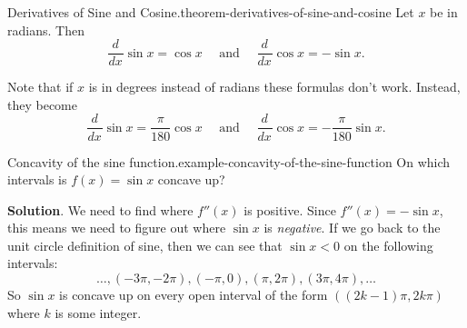 \documentclass[10pt,]{book}
\numberwithin{equation}{section}
\newcommand{\dv}[3][]{\dfrac{d^{#1} #2}{d #3^{#1}}}
\begin{document}
\begin{theorem}{Derivatives of Sine and Cosine.}{}{theorem-derivatives-of-sine-and-cosine}%
\hypertarget{p-130}{}%
Let \(x\) be in radians. Then%
\begin{equation*}
\dv{}{x}\sin x = \cos x\quad\text{ and }\quad\dv{}{x}\cos x = -\sin x.
\end{equation*}
%
\end{theorem}
\hypertarget{p-131}{}%
Note that if \(x\) is in degrees instead of radians these formulas don't work. Instead, they become%
\begin{equation*}
\dv{}{x}\sin x = \frac{\pi}{180}\cos x\quad\text{ and }\quad\dv{}{x}\cos x = -\frac{\pi}{180}\sin x.
\end{equation*}
%
\begin{example}{Concavity of the sine function.}{example-concavity-of-the-sine-function}%
\hypertarget{p-132}{}%
On which intervals is \(f(x) = \sin x\) concave up?%
\par\smallskip%
\noindent\textbf{Solution}.\hypertarget{solution-27}{}\quad%
\hypertarget{p-133}{}%
We need to find where \(f''(x)\) is positive. Since \(f''(x) = -\sin x\), this means we need to figure out where \(\sin x\) is \emph{negative}. If we go back to the unit circle definition of sine, then we can see that \(\sin x < 0\) on the following intervals:%
\begin{equation*}
\ldots, (-3\pi,-2\pi), (-\pi,0),(\pi,2\pi), (3\pi,4\pi),\ldots
\end{equation*}
So \(\sin x\) is concave up on every open interval of the form \(((2k-1)\pi, 2k\pi)\) where \(k\) is some integer.%
\end{example}
%
%
\typeout{************************************************}
\typeout{************************************************}
%
\end{document}
